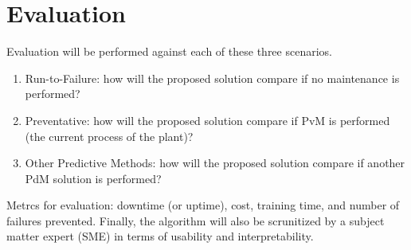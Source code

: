 \section{Evaluation}

Evaluation will be performed against each of these three scenarios.
\begin{enumerate}
    \item Run-to-Failure: how will the proposed solution compare if no maintenance is performed?
    \item Preventative: how will the proposed solution compare if PvM is performed (the current process of the plant)?
    \item Other Predictive Methods: how will the proposed solution compare if another PdM solution is performed?
\end{enumerate}

Metrcs for evaluation: downtime (or uptime), cost, training time, and number of failures prevented.
Finally, the algorithm will also be scrunitized by a subject matter expert (SME) in terms of usability and interpretability.
